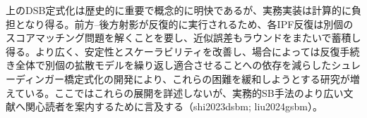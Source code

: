 上のDSB定式化は歴史的に重要で概念的に明快であるが、実務実装は計算的に負担となり得る。前方–後方射影が反復的に実行されるため、各IPF反復は別個のスコアマッチング問題を解くことを要し、近似誤差もラウンドをまたいで蓄積し得る。より広く、安定性とスケーラビリティを改善し、場合によっては反復手続き全体で別個の拡散モデルを繰り返し適合させることへの依存を減らしたシュレーディンガー橋定式化の開発により、これらの困難を緩和しようとする研究が増えている。ここではこれらの展開を詳述しないが、実務的SB手法のより広い文献へ関心読者を案内するために言及する（shi2023dsbm; liu2024gsbm）。

